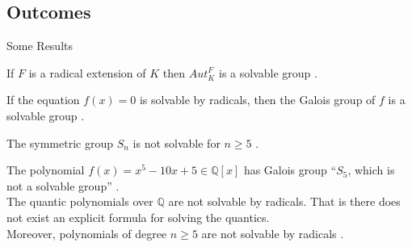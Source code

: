 \documentclass{beamer}
\begin{document}
\subsection{Outcomes}
\begin{frame}{Some Results}

  \begin{theorem}[Theorem]
If \(F\) is a radical extension of \(K\) then \(Aut_K^F\) is a solvable group \cite{hunger}.
\end{theorem}

\begin{corollary}[Corollary]
If the equation \(f(x)=0\) is solvable by radicals, then the Galois group of \(f\) is a solvable group \cite{hunger}.
\end{corollary}

\begin{theorem}[Theorem]
The symmetric group \(S_n\) is not solvable for \(n \geq 5\) \cite{hunger}.
\end{theorem}

  \begin{tcolorbox}[colback=white, colframe=red, boxsep=1mm, title={\bfseries \color{white} Outcomes}]
  The polynomial \(f(x)=x^5-10x+5 \in \mathbb{Q}[x]\) has Galois group ``\(S_5\), which is not a solvable group'' \cite{hunger}. \\
The quantic polynomials over \(\mathbb{Q}\) are not solvable by radicals. That is there does not exist an explicit formula for solving the quantics. \\
Moreover, \textcolor{green!50!black}{polynomials of degree \(n \geq 5\) are not solvable by radicals} \cite{hunger}.
\end{tcolorbox}

\end{frame}
\end{document}
